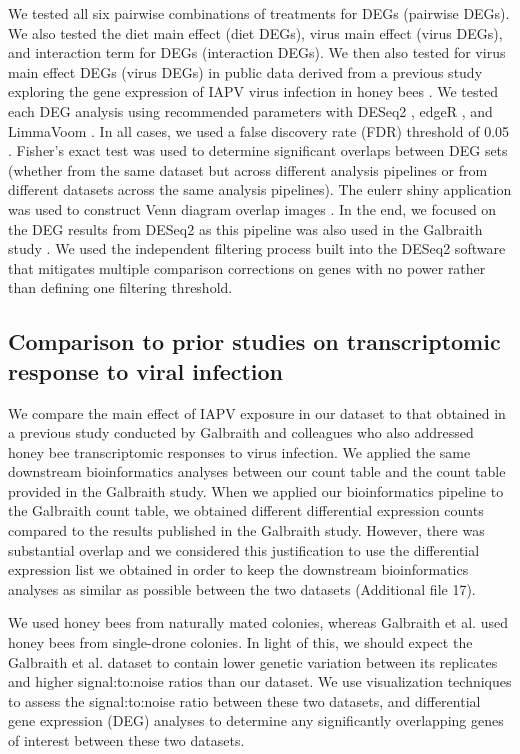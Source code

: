 \documentclass{bmcart}
\begin{document}
\begin{linenumbers}
\begin{doublespacing}
We tested all six pairwise combinations of treatments for DEGs (pairwise DEGs). We also tested the diet main effect (diet DEGs), virus main effect (virus DEGs), and interaction term for DEGs (interaction DEGs). We then also tested for virus main effect DEGs (virus DEGs) in public data derived from a previous study exploring the gene expression of IAPV virus infection in honey bees \cite{galbraith}. We tested each DEG analysis using recommended parameters with DESeq2 \cite{deseq2}, edgeR \cite{edger}, and LimmaVoom \cite{limma}. In all cases, we used a false discovery rate (FDR) threshold of 0.05 \cite{benjamini}. Fisher's exact test was used to determine significant overlaps between DEG sets (whether from the same dataset but across different analysis pipelines or from different datasets across the same analysis pipelines). The eulerr shiny application was used to construct Venn diagram overlap images \cite{euler}. In the end, we focused on the DEG results from DESeq2 \cite{deseq2} as this pipeline was also used in the Galbraith study \cite{galbraith}. We used the independent filtering process built into the DESeq2 software that mitigates multiple comparison corrections on genes with no power rather than defining one filtering threshold.

\subsection*{Comparison to prior studies on transcriptomic response to viral infection}

We compare the main effect of IAPV exposure in our dataset to that obtained in a previous study conducted by Galbraith and colleagues \cite{galbraith} who also addressed honey bee transcriptomic responses to virus infection. We applied the same downstream bioinformatics analyses between our count table and the count table provided in the Galbraith study. When we applied our bioinformatics pipeline to the Galbraith count table, we obtained different differential expression counts compared to the results published in the Galbraith study. However, there was substantial overlap and we considered this justification to use the differential expression list we obtained in order to keep the downstream bioinformatics analyses as similar as possible between the two datasets (Additional file 17). 

We used honey bees from naturally mated colonies, whereas Galbraith et al. \cite{galbraith} used honey bees from single-drone colonies. In light of this, we should expect the Galbraith et al. dataset to contain lower genetic variation between its replicates and higher signal:to:noise ratios than our dataset. We use visualization techniques to assess the signal:to:noise ratio between these two datasets, and differential gene expression (DEG) analyses to determine any significantly overlapping genes of interest between these two datasets.


\end{doublespacing}
\end{linenumbers}
\end{document}
